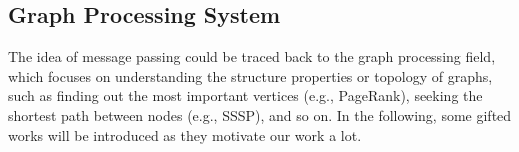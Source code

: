 \documentclass[conference]{IEEEtran}
\begin{document}


\subsection{Graph Processing System}
The idea of message passing could be traced back to the graph processing field, which focuses on understanding the structure properties or topology of graphs, such as finding out the most important vertices (e.g., PageRank\cite{b24}), seeking the shortest path between nodes (e.g., SSSP\cite{b25}), and so on.
In the following, some gifted works will be introduced as they motivate our work a lot.
\end{document}
